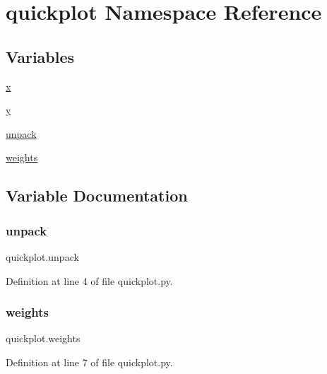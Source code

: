 \hypertarget{namespacequickplot}{}\section{quickplot Namespace Reference}
\label{namespacequickplot}
\subsection*{Variables}
\begin{DoxyCompactItemize}
\item 
\hyperlink{namespacequickplot_a81eab613e6132e2f34362e0d796374b6}{x}
\item 
\hyperlink{namespacequickplot_a010fcab3235443a7866d032bea36b2e8}{y}
\item 
\hyperlink{namespacequickplot_a26e9d46e54bdec05e3fe95d1105f5c63}{unpack}
\item 
\hyperlink{namespacequickplot_a665c218bc9c59ff692bf90bfbf077344}{weights}
\end{DoxyCompactItemize}


\subsection{Variable Documentation}
\mbox{\label{namespacequickplot_a26e9d46e54bdec05e3fe95d1105f5c63}} 
\subsubsection{\texorpdfstring{unpack}{unpack}}
{\footnotesize\ttfamily quickplot.\+unpack}



Definition at line 4 of file quickplot.\+py.

\mbox{\label{namespacequickplot_a665c218bc9c59ff692bf90bfbf077344}} 
\subsubsection{\texorpdfstring{weights}{weights}}
{\footnotesize\ttfamily quickplot.\+weights}



Definition at line 7 of file quickplot.\+py.

